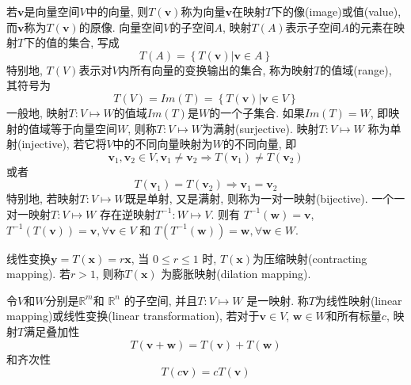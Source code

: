 \documentclass[lang=cn,10pt]{gorgeousnbook}
\numberwithin{equation}{section}%
\numberwithin{figure}{section}%
\begin{document}
若$\boldsymbol{v}$是向量空间$V$中的向量, 则$T\left(\boldsymbol{v}\right)$称为向量$\boldsymbol{v}$在映射$T$下的像(image)或值(value), 而$\boldsymbol{v}$称为$T\left(\boldsymbol{v}\right)$的原像. 向量空间$V$的子空间$A$, 映射$T\left(A\right)$表示子空间$A$的元素在映射$T$下的值的集合, 写成
\begin{equation}
T\left( A \right) =\left\{ T\left( \boldsymbol{v} \right) \left| \boldsymbol{v}\in A \right. \right\} 
\end{equation}
特别地, $T\left(V\right)$表示对$V$内所有向量的变换输出的集合, 称为映射$T$的值域(range), 其符号为
\begin{equation}
T\left( V \right) =Im\left( T \right) =\left\{ T\left( \boldsymbol{v} \right) \left| \boldsymbol{v}\in V \right. \right\} 
\end{equation}
一般地, 映射$T:V\mapsto W$的值域$Im\left( T \right)$是$W$的一个子集合. 如果$Im\left( T \right)=W$, 即映射的值域等于向量空间$W$, 则称$T:V\mapsto W$为满射(surjective). 映射$T:V\mapsto W$ 称为单射(injective), 若它将$V$中的不同向量映射为$W$的不同向量, 即
\begin{equation}
\boldsymbol{v}_1,\boldsymbol{v}_2\in V,\boldsymbol{v}_1\ne \boldsymbol{v}_2\Rightarrow T\left( \boldsymbol{v}_1 \right) \ne T\left( \boldsymbol{v}_2 \right) 
\end{equation}
或者
\begin{equation}
T\left( \boldsymbol{v}_1 \right) =T\left( \boldsymbol{v}_2 \right) \Rightarrow \boldsymbol{v}_1=\boldsymbol{v}_2
\end{equation}
特别地, 若映射$T:V\mapsto W$既是单射, 又是满射, 则称为一对一映射(bijective). 一个一对一映射$T: V\mapsto W$ 存在逆映射$T^{-1}: W\mapsto V$. 则有 $T^{-1}\left( \boldsymbol{w} \right) = \boldsymbol{v}$, $T^{-1}\left( T\left( \boldsymbol{v} \right)  \right) =  \boldsymbol{v},\forall \boldsymbol{v} \in V$ 和 $T\left( T^{-1}\left( \boldsymbol{w} \right)  \right) =  \boldsymbol{w},\forall \boldsymbol{w} \in W$. 

线性变换$\boldsymbol{y}=T\left( \boldsymbol{x} \right) =r\boldsymbol{x}$, 当 $0\le r\le 1$ 时, $T\left( \boldsymbol{x} \right)$为压缩映射(contracting mapping). 若$ r>1$, 则称$T\left( \boldsymbol{x} \right)$ 为膨胀映射(dilation mapping). 

\begin{definition}
令$V$和$W$分别是$\mathbb{R} ^m$和 $\mathbb{R} ^n$ 的子空间, 并且$T: V\mapsto W$ 是一映射. 称$T$为线性映射(linear mapping)或线性变换(linear transformation), 若对于$\boldsymbol{v}\in V$, $\boldsymbol{w}\in W$和所有标量$c$, 映射$T$满足叠加性
\begin{equation}
T\left( \boldsymbol{v}+\boldsymbol{w} \right) =T\left( \boldsymbol{v} \right) +T\left( \boldsymbol{w} \right) 
\end{equation}
和齐次性
\begin{equation}
T\left( c\boldsymbol{v} \right) =cT\left( \boldsymbol{v} \right) 
\end{equation}
\end{definition}
\end{document}
